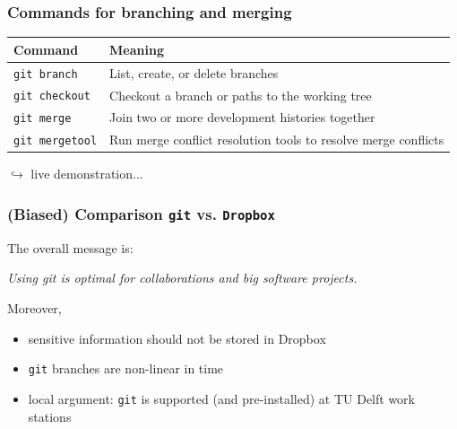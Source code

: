 \documentclass{beamer}
\begin{document}
\begin{frame}
\frametitle{Commands for branching and merging}
\begin{table}
\begin{tabularx}{\textwidth}{l|X}
Command & Meaning \\
 \hline
 \texttt{git branch} & List, create, or delete branches\\
 \texttt{git checkout} & Checkout a branch or paths to the working tree\\
 \texttt{git merge} & Join two or more development histories together\\
 \texttt{git mergetool} & Run merge conflict resolution tools to resolve merge conflicts\\
\end{tabularx}
\end{table}
\hfill $\hookrightarrow$ live demonstration...
\end{frame}
\begin{frame}
\frametitle{(Biased) Comparison \texttt{git} vs. \texttt{Dropbox}}

The overall message is:
\begin{center}
 \textit{Using git is optimal for collaborations and big software projects.}
\end{center}
Moreover,
\begin{itemize}
 \item sensitive information should not be stored in Dropbox
 \item \texttt{git} branches are non-linear in time
 \item local argument: \texttt{git} is supported (and pre-installed) at TU Delft work stations
\end{itemize}
\end{frame}
\end{document}
